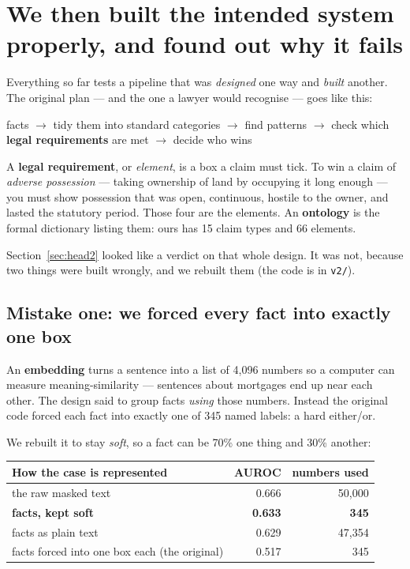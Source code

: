 \documentclass[12pt,a4paper]{article}
\newcommand{\code}[1]{\texttt{\small #1}}
\begin{document}
\section{We then built the intended system properly, and found out why it fails}\label{sec:v2}

Everything so far tests a pipeline that was \emph{designed} one way and \emph{built} another. The
original plan --- and the one a lawyer would recognise --- goes like this:

\begin{center}
facts $\rightarrow$ tidy them into standard categories $\rightarrow$ find patterns $\rightarrow$
check which \textbf{legal requirements} are met $\rightarrow$ decide who wins
\end{center}

A \textbf{legal requirement}, or \emph{element}, is a box a claim must tick. To win a claim of
\emph{adverse possession} --- taking ownership of land by occupying it long enough --- you must show
possession that was open, continuous, hostile to the owner, and lasted the statutory period. Those
four are the elements. An \textbf{ontology} is the formal dictionary listing them: ours has 15 claim
types and 66 elements.

Section~\ref{sec:head2} looked like a verdict on that whole design. It was not, because two things
were built wrongly, and we rebuilt them (the code is in \code{v2/}).

\subsection{Mistake one: we forced every fact into exactly one box}

An \textbf{embedding} turns a sentence into a list of 4,096 numbers so a computer can measure
meaning-similarity --- sentences about mortgages end up near each other. The design said to group
facts \emph{using} those numbers. Instead the original code forced each fact into exactly one of 345
named labels: a hard either/or.

We rebuilt it to stay \emph{soft}, so a fact can be 70\% one thing and 30\% another:

\begin{center}
\begin{tabular}{@{}lrr@{}}
\toprule
\textbf{How the case is represented} & \textbf{AUROC} & \textbf{numbers used} \\
\midrule
the raw masked text & 0.666 & 50,000 \\
\textbf{facts, kept soft} & \textbf{0.633} & \textbf{345} \\
facts as plain text & 0.629 & 47,354 \\
facts forced into one box each (the original) & 0.517 & 345 \\
\bottomrule
\end{tabular}
\end{center}
\end{document}

